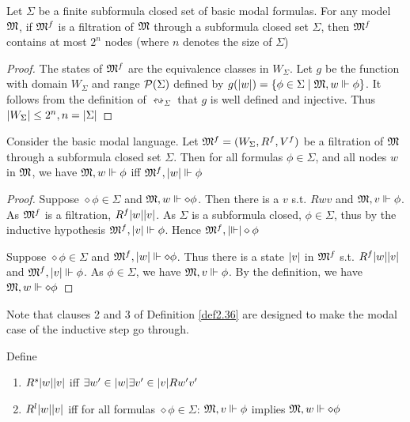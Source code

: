 \documentclass[11pt]{article}
\begin{document}
\begin{proposition}[]
Let \(\Sigma\) be a finite subformula closed set of basic modal formulas. For any
model \(\mathfrak{M}\), if \(\mathfrak{M}^f\) is a filtration of \(\mathfrak{M}\) through a subformula
closed set \(\Sigma\), then \(\mathfrak{M}^f\) contains at most \(2^n\) nodes (where \(n\)
denotes the size of \(\Sigma\))
\end{proposition}

\begin{proof}
The states of \(\mathfrak{M}^f\) are the equivalence classes in \(W_\Sigma\). Let
\(g\) be the function with domain \(W_\Sigma\) and range \(\mathcal{P}(\Sigma)\)
defined by \(g(\abs{w})=\{\phi\in\Sigma\mid\fM,w\Vdash\phi\}\). It follows
from the definition of \(\leftrightsquigarrow_\Sigma\) that \(g\) is well
defined and injective. Thus \(\abs{W_\Sigma}\le 2^n,n=\abs{\Sigma}\)
\end{proof}

\begin{theorem}
\label{thm2.39}
Consider the basic modal language. Let \(\mathfrak{M}^f=(W_\Sigma,R^f,V^f)\) be a
filtration of \(\mathfrak{M}\) through a subformula closed set \(\Sigma\). Then for all
formulas \(\phi\in\Sigma\), and all nodes \(w\) in \(\mathfrak{M}\), we have
\(\mathfrak{M},w\Vdash\phi\) iff \(\fM^f,\abs{w}\Vdash\phi\)
\end{theorem}

\begin{proof}
Suppose \(\diamond\phi\in\Sigma\) and \(\mathfrak{M},w\Vdash\diamond\phi\). Then there
is a \(v\) s.t. \(Rwv\) and \(\mathfrak{M},v\Vdash\phi\). As \(\mathfrak{M}^f\) is a
filtration, \(R^f\abs{w}\abs{v}\). As \(\Sigma\) is a subformula closed,
\(\phi\in\Sigma\), thus by the inductive hypothesis
\(\fM^f,\abs{v}\Vdash\phi\). Hence \(\fM^f,\abs\Vdash\diamond\phi\)

Suppose \(\diamond\phi\in\Sigma\) and \(\fM^f,\abs{w}\Vdash\diamond\phi\).
Thus there is a state \(\abs{v}\) in \(\mathfrak{M}^f\) s.t. \(R^f\abs{w}\abs{v}\)
and \(\fM^f,\abs{v}\Vdash\phi\). As \(\phi\in\Sigma\), we have
\(\mathfrak{M},v\Vdash\phi\). By the definition, we have \(\mathfrak{M},w\Vdash\diamond\phi\)
\end{proof}

Note that clauses 2 and 3 of Definition \ref{def2.36} are designed to make the
modal case of the inductive step go through.

Define
\begin{enumerate}
\item \(R^s\abs{w}\abs{v}\) iff \(\exists w'\in\abs{w}\exists v'\in\abs{v}Rw'v'\)
\item \(R^l\abs{w}\abs{v}\) iff for all formulas \(\diamond\phi\in\Sigma\):
\(\mathfrak{M},v\Vdash\phi\) implies \(\mathfrak{M},w\Vdash\diamond\phi\)
\end{enumerate}
\end{document}
